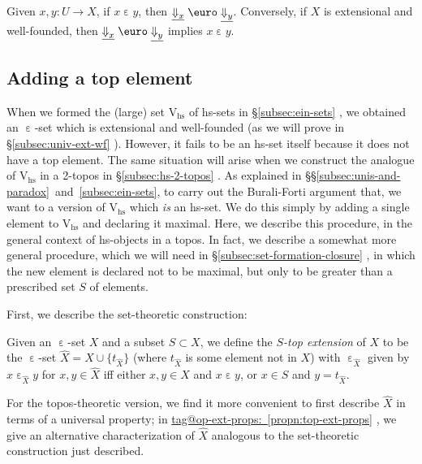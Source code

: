\documentclass{amsart}
\makeatletter
\newcommand\Dwn{{\Downarrow}}
\newcommand\Ein{\mathrel{\text{\textup{\euro}}}}
\newcommand\ein{\mathrel{\varepsilon}}
\newcommand\hs{\mathrm{hs}}
\newcommand\rV{\mathrm{V}}
\newcommand\set[2][]{#1\{ #2 #1\}}
\newcommand\und[1]{\underline{#1}}
\newcommand\unein{{\ein}}
\newcommand\wh[1]{\widehat{#1}}
\newcommand\prooflabel[1]{\gdef\proof@label{#1}}
\def\proof@label{}
\newcommand\tagword[1]{\csname tag@#1\endcsname}
\def\label@tag#1:#2\@nil{#1}
\newcommand\labeltag[1]{\label@tag#1:\@nil}
\newcommand\jref[1]{%
  \texorpdfstring%
    {\hyperref[#1]{\tagword{\labeltag{#1}}~\ref*{#1}}}%
    {\tagword{\labeltag{#1}}~\ref*{#1}}%
}
\newcommand\prerefpost[3]{%
  \texorpdfstring%
    {\hyperref[#2]{#1\ref*{#2}#3}}%
    {#1\ref*{#2}#3}%
}
\newcommand\sref[1]{\prerefpost{\S}{#1}{}}
\theoremstyle{definition}
\theoremstyle{remark}
\theoremstyle{plainwithref}
\newenvironment{settybox}{\begin{tcolorbox}[colback=blue!20,breakable%
    ,enhanced%
    ,sharp corners%
    ,frame hidden%
    ,boxsep=0pt
    ,left=5pt,right=5pt,top=5pt,bottom=5pt
    ,enlarge left by=-5pt,width=\linewidth+10pt
    ,enlarge top by=5pt,enlarge bottom by=5pt
    ,before skip balanced=0pt,after skip balanced=0pt
    ]}{\end{tcolorbox}}
\makeatother
\begin{document}
\prooflabel{proof:dwn-respects-ein}
\begin{propn} \label{propn:dwn-respects-ein}
  Given \( x,y \colon U \to X \), if \( x \ein y \), then \( \und{\Dwn_x} \Ein \und{\Dwn_y} \).
  Conversely, if \( X \) is extensional and well-founded, then \( \und{\Dwn_x} \Ein \und{\Dwn_y} \) implies \( x \ein y \).
\end{propn}

\subsection{Adding a top element} \label{subsec:top-element}
When we formed the (large) set \( \rV_{\hs} \) of hs-sets in \sref{subsec:ein-sets}, we obtained an \( \unein \)-set which is extensional and well-founded (as we will prove in \sref{subsec:univ-ext-wf}).
However, it fails to be an hs-set itself because it does not have a top element.
The same situation will arise when we construct the analogue of \( \rV_\hs \) in a 2-topos in \sref{subsec:hs-2-topos}.
As explained in \S\S\ref{subsec:unis-and-paradox}~and~\ref{subsec:ein-sets}, to carry out the Burali-Forti argument that, we want to a version of \( \rV_{\hs} \) which \emph{is} an hs-set.
We do this simply by adding a single element to \( \rV_{\hs} \) and declaring it maximal.
Here, we describe this procedure, in the general context of hs-objects in a topos.
In fact, we describe a somewhat more general procedure, which we will need in \sref{subsec:set-formation-closure}, in which the new element is declared not to be maximal, but only to be greater than a prescribed set \( S \) of elements.

First, we describe the set-theoretic construction:
\begin{settybox}
  \begin{defn}
    Given an \( \unein \)-set \( X \) and a subset \( S \subset X \), we define the \emph{\( S \)-top extension} of \( X \) to be the \( \unein \)-set \( \wh X = X \cup \set{t_{\wh X}} \) (where \( t_{\wh X} \) is some element not in \( X \)) with \( \unein_{\wh X} \) given by \( x \ein_{\wh X} y \) for \( x,y \in \wh X \) iff either \( x,y \in X \) and \( x \ein y \), or \( x \in S \) and \( y = t_{\wh X} \).
  \end{defn}
\end{settybox}

For the topos-theoretic version, we find it more convenient to first describe \( \wh X \) in terms of a universal property; in \jref{propn:top-ext-props}, we give an alternative characterization of \( \wh X \) analogous to the set-theoretic construction just described.
\end{document}
